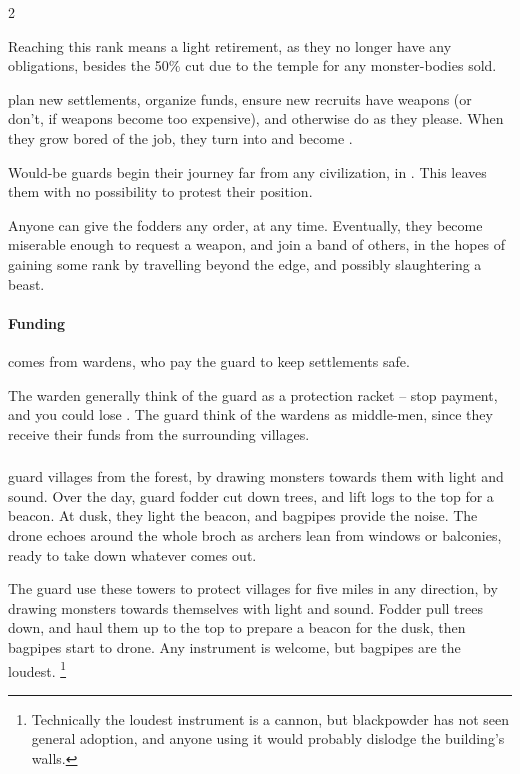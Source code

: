 \begin{multicols}{2}
\begin{description}
  Reaching this rank means a light retirement, as they no longer have any obligations, besides the 50\% cut due to the \gls{temple} for any \gls{monster}-bodies sold.
  
  \item[\Glspl{overseer}]
  plan new settlements, organize funds, ensure new recruits have weapons (or don't, if weapons become too expensive), and otherwise do as they please.
  When they grow bored of the job, they turn  into  and become .

\end{description}

\noindent
Would-be \glspl{guard} begin their journey far from any civilization, in .
This leaves them with no possibility to protest their position.

Anyone can give the \glspl{fodder} any order, at any time.
Eventually, they become miserable enough to request a weapon, and join a band of others, in the hopes of gaining some rank by travelling beyond the \gls{edge}, and possibly slaughtering a beast.

\paragraph{Funding}
comes from \glspl{warden}, who pay the guard to keep settlements safe.

The \gls{warden} generally think of the \gls{guard} as a protection racket -- stop payment, and you could lose .
The \gls{guard} think of the \glspl{warden} as middle-men, since they receive their funds from the surrounding \glspl{village}.

\subsubsection{}
guard \glspl{village} from the forest, by drawing monsters towards them with light and sound.
Over the day, \gls{guard} fodder cut down trees, and lift logs to the top for a beacon.
At dusk, they light the beacon, and bagpipes provide the noise.
The drone echoes around the whole \gls{broch} as archers lean from windows or balconies, ready to take down whatever comes out.

The \gls{guard} use these towers to protect \glspl{village} for five miles in any direction, by drawing monsters towards themselves with light and sound.
Fodder pull trees down, and haul them up to the top to prepare a beacon for the dusk, then bagpipes start to drone.
Any instrument is welcome, but bagpipes are the loudest.%
\footnote{Technically the loudest instrument is a cannon, but blackpowder has not seen general adoption, and anyone using it would probably dislodge the building's walls.}


\end{multicols}
